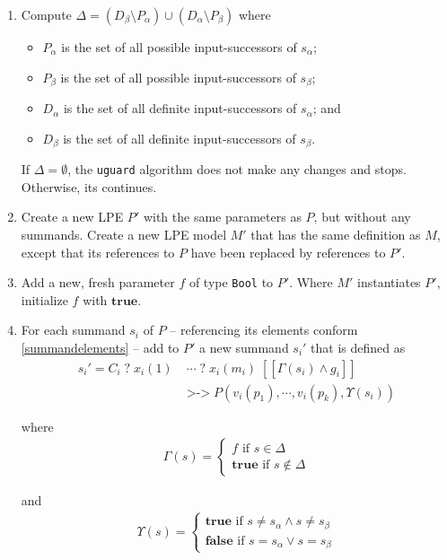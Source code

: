 \begin{enumerate}
\item Compute $\Delta = (D_\beta \setminus P_\alpha) \cup (D_\alpha \setminus P_\beta)$ where
\begin{itemize}
\item $P_\alpha$ is the set of all possible input-successors of $s_\alpha$;
\item $P_\beta$ is the set of all possible input-successors of $s_\beta$;
\item $D_\alpha$ is the set of all definite input-successors of $s_\alpha$; and
\item $D_\beta$ is the set of all definite input-successors of $s_\beta$.
\end{itemize}

If $\Delta = \emptyset{}$, the \texttt{uguard} algorithm does not make any changes and stops. Otherwise, its continues.

\item Create a new LPE $P'$ with the same parameters as $P$, but without any summands.
Create a new LPE model $M'$ that has the same definition as $M$, except that its references to $P$ have been replaced by references to $P'$.

\item Add a new, fresh parameter $f$ of type \texttt{Bool} to $P'$.
Where $M'$ instantiates $P'$, initialize $f$ with $\textbf{true}$.

\item For each summand $s_i$ of $P$ -- referencing its elements conform \ref{summandelements} -- add to $P'$ a new summand ${s_i}'$ that is defined as
\begin{align*}
{s_i}' = C_i \; \texttt{?} \; x_i(1) \; &\cdots{} \; \texttt{?} \; x_i(m_i) \; [[\Gamma(s_i) \land g_i]] \\
&\texttt{>->} \; P(v_i(p_1), \cdots{}, v_i(p_k), \Upsilon(s_i))
\end{align*}

where
\begin{align*}
\Gamma(s) = \begin{cases}
f \text{ if } s \in \Delta \\
\textbf{true} \text{ if } s \notin \Delta
\end{cases}
\end{align*}

and
\begin{align*}
\Upsilon(s) = \begin{cases}
\textbf{true} \text{ if } s \neq s_\alpha \land s \neq s_\beta \\
\textbf{false} \text{ if } s = s_\alpha \lor s = s_\beta
\end{cases}
\end{align*}
\end{enumerate}

